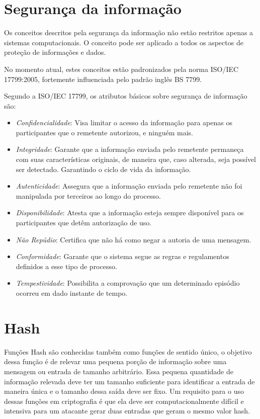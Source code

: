 \documentclass{ufsctex/ufsctex}
\begin{document}
\section{Segurança da informação}

Os conceitos descritos pela segurança da informação não estão restritos apenas
a sistemas computacionais. O conceito pode ser aplicado a todos os aspectos de
proteção de informações e dados. 

No momento atual, estes conceitos estão padronizados pela norma ISO/IEC
17799:2005, fortemente influenciada pelo padrão inglês BS 7799.

Segundo a ISO/IEC 17799, os atributos básicos sobre segurança de informação
são:

\begin{itemize}
	\item \textit{Confidencialidade}: Visa limitar o acesso da informação para
		apenas os participantes que o remetente autorizou, e ninguém mais.
	\item \textit{Integridade}: Garante que a informação enviada pelo remetente
		permaneça com suas características originais, de maneira que, caso
		alterada, seja possível ser detectado. Garantindo o ciclo de vida da
		informação.
	\item \textit{Autenticidade}: Assegura que a informação enviada pelo
		remetente não foi manipulada por terceiros ao longo do processo.
	\item \textit{Disponibilidade}: Atesta que a informação esteja sempre
		disponível para os participantes que detêm autorização de uso.
	\item \textit{Não Repúdio}: Certifica que não há como negar a autoria de
		uma mensagem.
	\item \textit{Conformidade}: Garante que o sistema segue as regras e
		regulamentos definidos a esse tipo de processo.
	\item \textit{Tempestividade}: Possibilita a comprovação que um determinado
		episódio ocorreu em dado instante de tempo.
\end{itemize}
\cite{ISO17799}

\section{Hash}

Funções Hash são conhecidas também como funções de sentido único, o objetivo
dessa função é de relevar uma pequena porção de informação sobre uma mensagem
ou entrada de tamanho arbitrário.  Essa pequena quantidade de informação
relevada deve ter um tamanho suficiente para identificar a entrada de maneira
única e o tamanho dessa saída deve ser fixo. Um requisito para o uso dessas
funções em criptografia é que ela deve ser computacionalmente difícil e
intensiva para um atacante gerar duas entradas que geram o mesmo valor hash.
\cite{cryptoschool}
\end{document}
